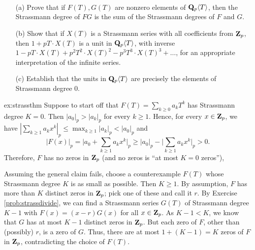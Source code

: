 \begin{challenge}\mbox{ }
\begin{enumerate}
\vspace{-0.12in}
\item[(a)] Prove that if $F(T), G(T)$ are nonzero elements of $\mathbf{Q}_p\langle T\rangle$, then the Strassmann degree of $FG$ is the sum of the Strassmann degrees of $F$ and $G$.
\item[(b)] Show that if $X(T)$ is a Strassmann series with all coefficients from $\mathbf{Z}_p$, then $1+pT \cdot X(T)$ is a unit in $\mathbf{Q}_p\langle T\rangle$, with inverse $1 - pT\cdot X(T) + p^2 T^2 \cdot X(T)^2 - p^3 T^3 \cdot X(T)^3 + \dots$, for an appropriate interpretation of the infinite series.
\item[(c)] Establish that the units in $\mathbf{Q}_p\langle T\rangle$ are precisely the elements of Strassmann degree $0$.
\end{enumerate}
\end{challenge}




\begin{sol}{ex:strassthm} Suppose to start off that  $F(T) = \sum_{k\ge 0} a_k T^k$ has Strassmann degree $K=0$. Then $|a_{0}|_p > |a_k|_p$ for every $k\ge 1$. Hence, for every $x\in \mathbf{Z}_p$, we have $|\sum_{k\ge 1} a_k x^k|_p \le \max_{k\ge 1}|a_k|_p < |a_0|_p$  and
\[ |F(x)|_p = \bigg|a_0 + \sum_{k\ge 1} a_k x^k\bigg|_p \ge |a_0|_p - \bigg|\sum_{k\ge 1} a_k x^k\bigg|_p > 0.\]
Therefore, $F$ has no zeros in $\mathbf{Z}_p$ (and no zeros is ``at most $K=0$ zeros''), 

Assuming the general claim fails,  choose a counterexample $F(T)$ whose Strassmann degree $K$ is as small as possible. Then $K\ge 1$. By assumption, $F$ has more than $K$ distinct zeros in $\mathbf{Z}_p$; pick one of these and call it $r$. By Exercise \ref{prob:strassdivide}, we can find a Strassmann series $G(T)$ of Strassmann degree $K-1$ with $F(x) = (x-r) G(x)$ for all $x \in \mathbf{Z}_p$. As $K-1 < K$, we know that $G$ has at most $K-1$ distinct zeros in $\mathbf{Z}_p$. But each zero of $F$, other than (possibly) $r$, is a zero of $G$. Thus, there are at most $1+(K-1)= K$ zeros of $F$ in $\mathbf{Z}_p$, contradicting the choice of $F(T)$.
\end{sol}

